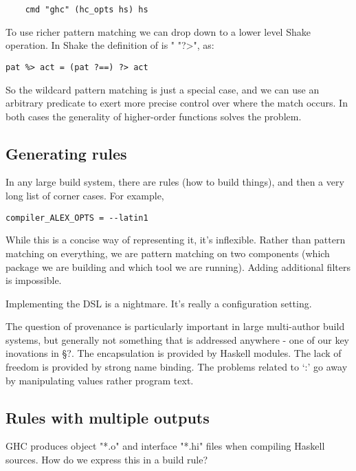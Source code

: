\begin{lstlisting}
    cmd "ghc" (hc_opts hs) hs
\end{lstlisting}
\noindent
To use richer pattern matching we can drop down to a lower level Shake
operation. In Shake the definition of is \lst"%
\lst"?>", as:

\begin{verbatim}
pat %> act = (pat ?==) ?> act
\end{verbatim}
\noindent
So the wildcard pattern matching is just a special case, and we can use an
arbitrary predicate to exert more precise control over where the match occurs.
In both cases the generality of higher-order functions solves the problem.

\subsection{Generating rules}


In any large build system, there are rules (how to build things), and then a
very long list of corner cases. For example,

\begin{lstlisting}
compiler_ALEX_OPTS = --latin1
\end{lstlisting}

While this is a concise way of representing it, it's inflexible. Rather than
pattern matching on everything, we are pattern matching on two components (which
package we are building and which tool we are running). Adding additional
filters is impossible.

Implementing the DSL is a nightmare. It's really a configuration setting.

The question of provenance is particularly important in large multi-author build
systems, but generally not something that is addressed anywhere - one of our key
inovations in \S?. The encapsulation is provided by Haskell modules. The lack of
freedom is provided by strong name binding. The problems related to `:' go away
by manipulating values rather program text.

\subsection{Rules with multiple outputs\label{sec:multiple-outputs}}

GHC produces object \lst"*.o" and interface \lst"*.hi" files when compiling 
Haskell sources. How do we express this in a build rule?

